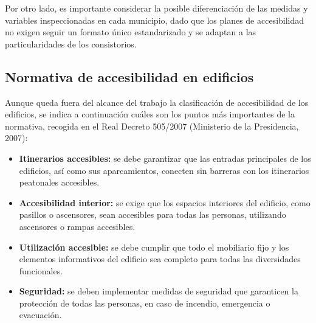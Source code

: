 Por otro lado, es importante considerar la posible diferenciación de las medidas y variables inspeccionadas en cada municipio, dado que los planes de accesibilidad no exigen seguir un formato único estandarizado y se adaptan a las particularidades de los consistorios.
\\

\subsection{Normativa de accesibilidad en edificios}
Aunque queda fuera del alcance del trabajo la clasificación de accesibilidad de los edificios, se indica a continuación cuáles son los puntos más importantes de la normativa, recogida en el Real Decreto 505/2007 (Ministerio de la Presidencia, 2007):
\begin{itemize}
    \item \textbf{Itinerarios accesibles:} se debe garantizar que las entradas principales de los edificios, así como sus aparcamientos, conecten sin barreras con los itinerarios peatonales accesibles.
    \item \textbf{Accesibilidad interior:} se exige que los espacios interiores del edificio, como pasillos o ascensores, sean accesibles para todas las personas, utilizando ascensores o rampas accesibles.
    \item \textbf{Utilización accesible:} se debe cumplir que todo el mobiliario fijo y los elementos informativos del edificio sea completo para todas las diversidades funcionales.
    \item \textbf{Seguridad:} se deben implementar medidas de seguridad que garanticen la protección de todas las personas, en caso de incendio, emergencia o evacuación.
\end{itemize}
